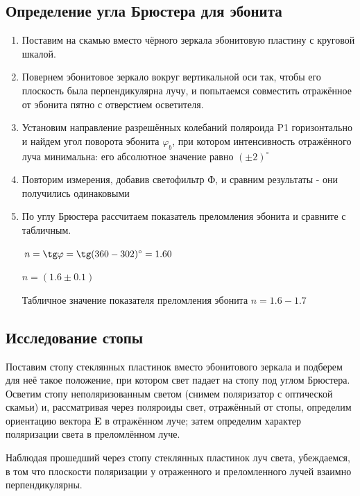 \subsection{Определение угла Брюстера для эбонита}
\begin{enumerate}
\item Поставим на скамью вместо чёрного зеркала эбонитовую пластину с круговой шкалой.

\item  Повернем эбонитовое зеркало вокруг вертикальной оси так, чтобы его
плоскость была перпендикулярна лучу, и попытаемся совместить отражённое от эбонита пятно с отверстием осветителя.

\item Установим направление разрешённых
колебаний поляроида P1 горизонтально и найдем угол поворота эбонита
$\varphi_b$, при котором интенсивность
отражённого луча минимальна: его абсолютное значение равно $( \pm 2)^{\circ}$

\item Повторим измерения, добавив светофильтр Ф, и сравним результаты - они получились одинаковыми

\item По углу Брюстера рассчитаем показатель преломления эбонита и сравните с табличным.
\begin{center}
    $n = \tg \varphi = \tg (360-302)^{\circ} = 1.60$
\end{center}
\begin{center}
    $n = (1.6 \pm 0.1)$
\end{center}
Табличное значение показателя преломления эбонита $n = 1.6 - 1.7$

\end{enumerate}

\subsection{Исследование стопы}

\begin{figure}[h!]
\end{figure}

Поставим стопу стеклянных пластинок вместо эбонитового зеркала
и подберем для неё такое положение, при
котором свет падает на стопу под углом Брюстера.
Осветим стопу неполяризованным светом (снимем поляризатор с оптической скамьи) и, рассматривая через поляроиды свет, отражённый от стопы, определим ориентацию вектора
\textbf{E} в отражённом луче; затем определим
характер поляризации света в преломлённом луче. 
\par Наблюдая прошедший через стопу стеклянных пластинок луч света, убеждаемся, в
том что плоскости поляризации у отраженного и преломленного лучей взаимно
перпендикулярны. 

